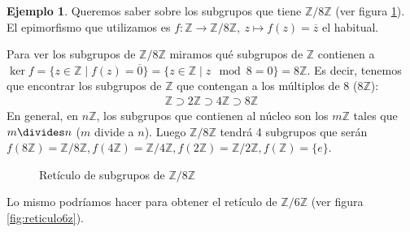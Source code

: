 \documentclass{book}
\theoremstyle{definition}
\newtheorem{ej}{Ejemplo}
\theoremstyle{remark}
\newcommand{\Z}{\mathbb{Z}}
\begin{document}
\begin{ej}
	Queremos saber sobre los subgrupos que tiene $\mathbb{Z}/8\mathbb{Z}$ (ver figura \ref{fig:reticulo8z}). El epimorfismo que utilizamos es $f:\Z \to \mathbb{Z}/8\mathbb{Z},\ z \mapsto f(z) = \overline{z}$ el habitual.
	
	Para ver los subgrupos de $\mathbb{Z}/8\mathbb{Z}$ miramos qué subgrupos de $\Z$ contienen a $\ker f = \{ z \in \Z \mid f(z) = \overline{0}\} = \{z \in \Z \mid z \mod 8 = 0\} = 8\Z$. Es decir, tenemos que encontrar los subgrupos de $\Z$ que contengan a los múltiplos de  8 ($8\Z$):
	\begin{align*}
	\Z \supset 2\Z \supset 4\Z \supset 8\Z
	\end{align*}
	En general, en $n\Z$, los subgrupos que contienen al núcleo son los $m\Z$ tales que $m \divides n$ ($m$ divide a $n$). 
	Luego $\mathbb{Z}/8\mathbb{Z}$ tendrá 4 subgrupos que serán $f(8\Z) = \mathbb{Z}/8\mathbb{Z}, f(4\Z) = \mathbb{Z}/4\mathbb{Z}, f(2\Z) = \mathbb{Z}/2\mathbb{Z}, f(\Z) = \{e\}$. 
\end{ej}

\begin{figure}[h]
	\centering
	
	\label{fig:reticulo8z}
	\caption{Retículo de subgrupos de $\mathbb{Z}/8\mathbb{Z}$}
\end{figure}

Lo mismo podríamos hacer para obtener el retículo de $\Z/6\Z$ (ver figura \ref{fig:reticulo6z}).
\end{document}
